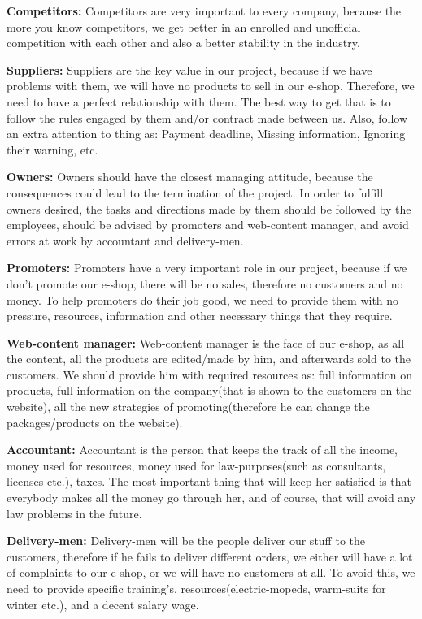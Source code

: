 \documentclass[12p]{article}
\begin{document}
\textbf{Competitors:}
Competitors are very important to every company, because the more you know competitors, we get better in an enrolled and unofficial competition with each other and also a better stability in the industry.

\textbf{Suppliers:}
Suppliers are the key value in our project, because if we have problems with them, we will have no products to sell in our e-shop. Therefore, we need to have a perfect relationship with them. The best way to get that is to follow the rules engaged by them and/or contract made between us. Also, follow an extra attention to thing as: Payment deadline, Missing information, Ignoring their warning, etc.

\textbf{Owners:}
Owners should have the closest managing attitude, because the consequences could lead to the termination of the project. In order to fulfill owners desired, the tasks and directions made by them should be followed by the employees, should be advised by promoters and web-content manager, and avoid errors at work by accountant and delivery-men.

\textbf{Promoters:}
Promoters have a very important role in our project, because if we don't promote our e-shop, there will be no sales, therefore no customers and no money. To help promoters do their job good, we need to provide them with no pressure, resources, information and other necessary things that they require.

\textbf{Web-content manager:}
Web-content manager is the face of our e-shop, as all the content, all the products are edited/made by him, and afterwards sold to the customers. We should provide him with required resources as: full information on products, full information on the company(that is shown to the customers on the website), all the new strategies of promoting(therefore he can change the packages/products on the website).

\textbf{Accountant:}
Accountant is the person that keeps the track of all the income, money used for resources, money used for law-purposes(such as consultants, licenses etc.), taxes. The most important thing that will keep her satisfied is that everybody makes all the money go through her, and of course, that will avoid any law problems in the future.

\textbf{Delivery-men:}
Delivery-men will be the people deliver our stuff to the customers, therefore if he fails to deliver different orders, we either will have a lot of complaints to our e-shop, or we will have no customers at all. To avoid this, we need to provide specific training's, resources(electric-mopeds, warm-suits for winter etc.), and a decent salary wage.
\end{document}
